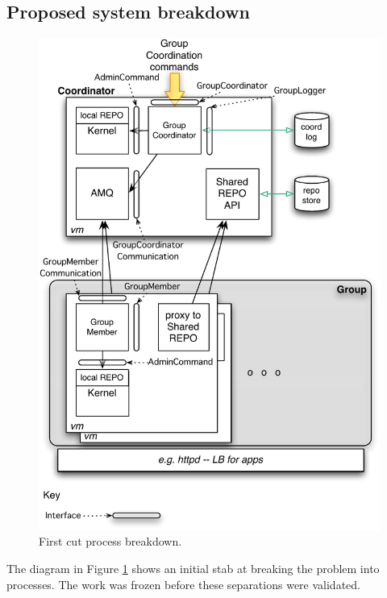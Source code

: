 \documentclass[a4paper,12pt]{article}
\begin{document}
\subsection{Proposed system breakdown}
\begin{figure}[h]
\centering
\includegraphics*[scale=0.6]{ProcessesDist.pdf}
\caption{First cut process breakdown.}
\label{fig:processes}
\end{figure}
The diagram in Figure \ref{fig:processes} 
shows an initial stab at breaking the problem into processes. The work was frozen before these separations were validated.
\end{document}
